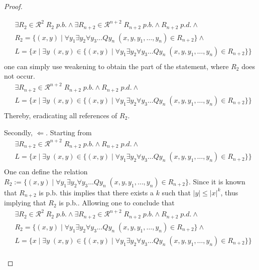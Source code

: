\documentclass [11pt]{article}
\begin{document}
\begin{proof}
\begin{enumerate}
\begin{equation*}
\begin{split}
&\exists R_2 \in \mathcal{R}^{2} \; R_2 \; p.b.  \land  \exists R_{n+2}  \in  \mathcal{R}^{n+2} \; R_{n+2} \; p.b. \land R_{n+2} \; p.d. \land  \\
&R_2 = \{(x,y) \mid \forall y_1 \exists y_2\forall y_3\dots Q y_n  \; (x,y,y_1,\ldots,y_n) \in R_{n+2}\}  \land\\ 
& L = \{x \mid \exists y \; (x,y) \in  \{(x,y) \mid \forall y_1 \exists y_2\forall y_3\dots Q y_n  \; (x,y,y_1,\ldots,y_n) \in R_{n+2}\}\}  \\ 
\end{split}
\end{equation*}
one can simply use weakening to obtain the part of the statement, where $R_2$ does not occur. 
\begin{equation*}
\begin{split}
& \exists R_{n+2}  \in  \mathcal{R}^{n+2} \; R_{n+2} \; p.b. \land R_{n+2} \; p.d. \land  \\
& L = \{x \mid \exists y \; (x,y) \in  \{(x,y) \mid \forall y_1 \exists y_2\forall y_3\dots Q y_n  \; (x,y,y_1,\ldots,y_n) \in R_{n+2}\}\}  \\ 
\end{split}
\end{equation*}
Thereby, eradicating all references of $R_2$. 

\medskip
Secondly, $\Leftarrow$. Starting from 
\begin{equation*}
\begin{split}
& \exists R_{n+2}  \in  \mathcal{R}^{n+2} \; R_{n+2} \; p.b. \land R_{n+2} \; p.d. \land  \\
& L = \{x \mid \exists y \; (x,y) \in  \{(x,y) \mid \forall y_1 \exists y_2\forall y_3\dots Q y_n  \; (x,y,y_1,\ldots,y_n) \in R_{n+2}\}\}  \\ 
\end{split}
\end{equation*}
One can define the relation $R_2:=\{(x,y) \mid \forall y_1 \exists y_2\forall y_3\dots Q y_n  \; (x,y,y_1,\ldots,y_n) \in R_{n+2}\} $.
Since it is known that $R_{n+2}$ is p.b. this implies that there exists a $k$ such that $|y| \leq |x|^k$, thus implying that $R_2$ is p.b..
Allowing one to conclude that
\begin{equation*}
\begin{split}
&\exists R_2 \in \mathcal{R}^{2} \; R_2 \; p.b.  \land  \exists R_{n+2}  \in  \mathcal{R}^{n+2} \; R_{n+2} \; p.b. \land R_{n+2} \; p.d. \land  \\
&R_2 = \{(x,y) \mid \forall y_1 \exists y_2\forall y_3\dots Q y_n  \; (x,y,y_1,\ldots,y_n) \in R_{n+2}\}  \land\\ 
& L = \{x \mid \exists y \; (x,y) \in  \{(x,y) \mid \forall y_1 \exists y_2\forall y_3\dots Q y_n  \; (x,y,y_1,\ldots,y_n) \in R_{n+2}\}\}  \\ 
\end{split}
\end{equation*}


\end{enumerate}
\end{proof}
\end{document}
